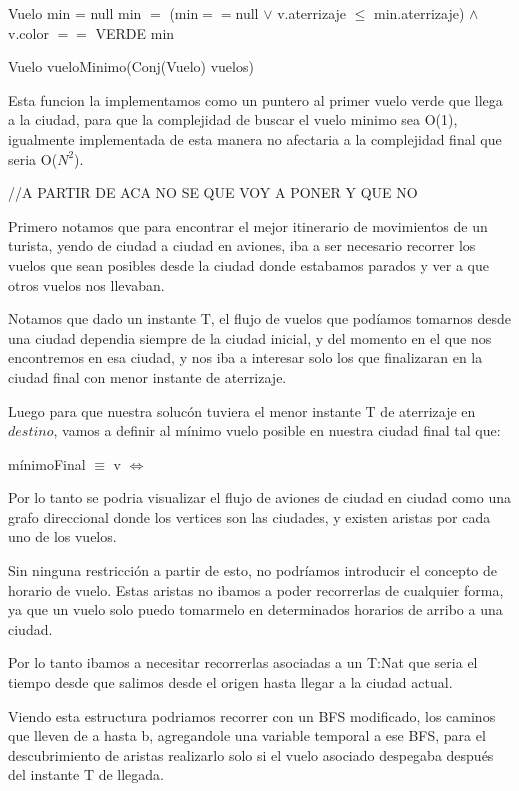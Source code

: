 \begin{algorithm}[H]
\begin{algorithmic}[1]
\STATE Vuelo min = null
	\STATE min $=$ (min$==$null $\vee$ v.aterrizaje $\leq$ min.aterrizaje) $\wedge$ v.color $==$ VERDE
\ENDFOR
\RETURN min
\caption{Vuelo vueloMinimo(Conj(Vuelo) vuelos)}%
\end{algorithmic}
\end{algorithm}

Esta funcion la implementamos como un puntero al primer vuelo verde que llega a la ciudad, para que la complejidad de buscar el vuelo minimo sea O(1), igualmente implementada de esta manera no afectaria a la complejidad final que seria O($N^{2}$).

//A PARTIR DE ACA NO SE QUE VOY A PONER Y QUE NO


Primero notamos que para encontrar el mejor itinerario de movimientos de un turista, yendo de ciudad a ciudad en aviones, iba a ser necesario recorrer los vuelos que sean posibles desde la ciudad donde estabamos parados y ver a que otros vuelos nos llevaban. 

Notamos que dado un instante T, el flujo de vuelos que pod\'iamos tomarnos desde una ciudad dependia siempre de la ciudad inicial, y del momento en el que nos encontremos en esa ciudad, y nos iba a interesar solo los que finalizaran en la ciudad final con menor instante de aterrizaje.

Luego para que nuestra soluc\'on tuviera el menor instante T de aterrizaje en $destino$, vamos a definir al m\'inimo vuelo posible en nuestra ciudad final tal que:

m\'inimoFinal $\equiv$ v $\Leftrightarrow$ 


Por lo tanto se podria visualizar el flujo de aviones de ciudad en ciudad como una grafo direccional donde los vertices son las ciudades, y existen aristas por cada uno de los vuelos. 

Sin ninguna restricci\'on a partir de esto, no podr\'iamos introducir el concepto de horario de vuelo.
Estas aristas no ibamos a poder recorrerlas de cualquier forma, ya que un vuelo solo puedo tomarmelo en determinados horarios de arribo a una ciudad. 

Por lo tanto ibamos a necesitar recorrerlas asociadas a un T:Nat que seria el tiempo desde que salimos desde el origen hasta llegar a la ciudad actual.

Viendo esta estructura podriamos recorrer con un BFS modificado, los caminos que lleven de a hasta b, agregandole una variable temporal a ese BFS, para el descubrimiento de aristas realizarlo solo si el vuelo asociado despegaba despu\'es del instante T de llegada.

